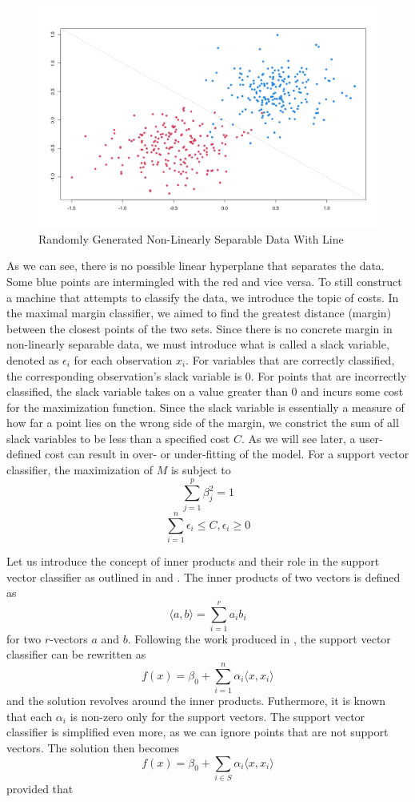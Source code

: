 \documentclass[12pt]{article}
\begin{document}
\begin{figure}
    \centering
    \includegraphics[width=5in]{Figures/svc_randomly_generated_w_line.png}
    \caption{Randomly Generated Non-Linearly Separable Data With Line}
    \label{fig_svc_randomly_generated_w_line}
\end{figure}

As we can see, there is no possible linear hyperplane that separates the data. Some blue points are intermingled with the red and vice versa. To still construct a machine that attempts to classify the data, we introduce the topic of costs. In the maximal margin classifier, we aimed to find the greatest distance (margin) between the closest points of the two sets. Since there is no concrete margin in non-linearly separable data, we must introduce what is called a slack variable, denoted as $\epsilon_i$ for each observation $x_i$. For variables that are correctly classified, the corresponding observation's slack variable is 0. For points that are incorrectly classified, the slack variable takes on a value greater than 0 and incurs some cost for the maximization function. Since the slack variable is essentially a measure of how far a point lies on the wrong side of the margin, we constrict the sum of all slack variables to be less than a specified cost $C$. As we will see later, a user-defined cost can result in over- or under-fitting of the model. For a support vector classifier, the maximization of \(M\) is subject to \[ \sum_{j=1}^{p} \beta^2_j=1 \] \[ \sum_{i=1}^{n} \epsilon_i \le C, \epsilon_i \ge 0 \]

Let us introduce the concept of inner products and their role in the support vector classifier as outlined in \citep{introstatlearning} and \citep{esl2}. The inner products of two vectors is defined as \[ \langle a,b \rangle=\sum_{i=1}^{r}a_ib_i \] for two \(r\)-vectors \(a\) and \(b\). Following the work produced in \citep{introstatlearning}, the support vector classifier can be rewritten as \[f(x) = \beta_0 + \sum_{i=1}^n \alpha_i \langle x,x_i \rangle \] and the solution revolves around the inner products. Futhermore, it is known that each \(\alpha_i\) is non-zero only for the support vectors. The support vector classifier is simplified even more, as we can ignore points that are not support vectors. The solution then becomes \[f(x) = \beta_0 + \sum_{i \in S} \alpha_i \langle x,x_i \rangle \] provided that
\end{document}

